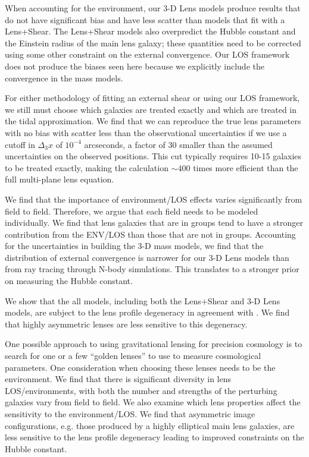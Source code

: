 \documentclass{emulateapj}
\begin{document}
When accounting for the environment, our 3-D Lens models produce results that do not have significant bias and have less scatter than models that fit with a Lens+Shear. The Lens+Shear models also overpredict the Hubble constant and the Einstein radius of the main lens galaxy; these quantities need to be corrected using some other constraint on the external convergence. Our LOS framework does not produce the biases seen here because we explicitly include the convergence in the mass models.

For either methodology of fitting an external shear or using our LOS framework, we still must choose which galaxies are treated exactly and which are treated in the tidal approximation. We find that we can reproduce the true lens parameters with no bias with scatter less than the observational uncertainties if we use a cutoff in $\Delta_3 x$ of $10^{-4}$ arcseconds, a factor of 30 smaller than the assumed uncertainties on the observed positions. This cut typically requires 10-15 galaxies to be treated exactly, making the calculation $\sim 400$ times more efficient than the full multi-plane lens equation.

We find that the importance of environment/LOS effects varies significantly from field to field. Therefore, we argue that each field needs to be modeled individually. We find that lens galaxies that are in groups tend to have a stronger contribution from the ENV/LOS than those that are not in groups. Accounting for the uncertainties in building the 3-D mass models, we find that the distribution of external convergence is narrower for our 3-D Lens models than from ray tracing through N-body simulations. This translates to a stronger prior on measuring the Hubble constant.

We show that the all models, including both the Lens+Shear and 3-D Lens models, are subject to the lens profile degeneracy in agreement with \citet{Xu15,Schneider13}. We find that highly asymmetric lenses are less sensitive to this degeneracy.

One possible approach to using gravitational lensing for precision cosmology is to search for one or a few ``golden lenses'' to use to measure cosmological parameters. One consideration when choosing these lenses needs to be the environment. We find that there is significant diversity in lens LOS/environments, with both the number and strengths of the perturbing galaxies vary from field to field.  We also examine which lens properties affect the sensitivity to the environment/LOS. We find that asymmetric image configurations, e.g. those produced by a highly elliptical main lens galaxies, are less sensitive to the lens profile degeneracy leading to improved constraints on the Hubble constant.
\end{document}
